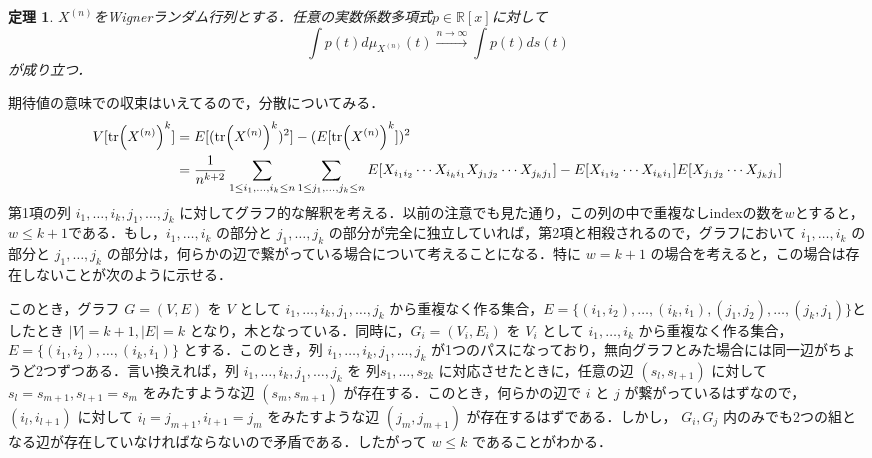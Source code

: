 \documentclass{ltjsarticle}
\makeatletter
\theoremstyle{mystyle1}
\newtheorem{thm}[dfn]{定理}
\theoremstyle{mystyle2}
\theoremstyle{mystyle3}
\renewenvironment{proof}[1][\proofname]{\par
  \pushQED{\qed}%
  \normalfont
  \topsep6\p@\@plus6\p@ \trivlist
  \item[\hskip\labelsep{\bfseries\sffamily #1}]\ignorespaces
}{%
  \popQED\endtrivlist\@endpefalse
}
\renewcommand\proofname{証明}
\makeatother
\begin{document}
\begin{thm}\label{thm:1-26}
    $X^{(n)}$をWignerランダム行列とする．任意の実数係数多項式$p\in\mathbb{R}[x]$に対して
    \begin{equation}
        \int p(t)d\mu_{X^{(n)}}(t)\overset{n\to\infty}{\longrightarrow}\int p(t)ds(t)
    \end{equation}
    が成り立つ．
\end{thm}

\begin{proof}
    期待値の意味での収束はいえてるので，分散についてみる．
    \begin{equation}
        \begin{split}
            V[\tr(X^{(n)})^k]
            & =E[(\tr(X^{(n)})^k)^2]-(E[\tr(X^{(n)})^k])^2                                                                                                                                                               \\
            & =\frac{1}{n^{k+2}}\sum_{1\leq i_1,\ldots,i_k\leq n}\sum_{1\leq j_1,\ldots,j_k\leq n}E[X_{i_1i_2}\cdots X_{i_ki_1}X_{j_1j_2}\cdots X_{j_kj_1}]-E[X_{i_1i_2}\cdots X_{i_ki_1}]E[X_{j_1j_2}\cdots X_{j_kj_1}]
        \end{split}
    \end{equation}
    第1項の列 $i_1,\ldots,i_k,j_1,\ldots,j_k$ に対してグラフ的な解釈を考える．以前の注意でも見た通り，この列の中で重複なしindexの数を$w$とすると，$w\leq k+1$である．もし，$i_1,\ldots,i_k$ の部分と $j_1,\ldots,j_k$ の部分が完全に独立していれば，第2項と相殺されるので，グラフにおいて $i_1,\ldots,i_k$ の部分と $j_1,\ldots,j_k$ の部分は，何らかの辺で繋がっている場合について考えることになる．特に $w=k+1$ の場合を考えると，この場合は存在しないことが次のように示せる．

    このとき，グラフ $G=(V,E)$ を $V$ として $i_1,\ldots,i_k,j_1,\ldots,j_k$ から重複なく作る集合，$E=\{(i_1,i_2),\ldots,(i_k,i_1),(j_1,j_2),\ldots,(j_k,j_1)\}$としたとき $|V|=k+1,|E|=k$ となり，木となっている．同時に，$G_i=(V_i,E_i)$ を $V_i$ として $i_1,\ldots,i_k$ から重複なく作る集合，$E=\{(i_1,i_2),\ldots,(i_k,i_1)\}$ とする．このとき，列 $i_1,\ldots,i_k,j_1,\ldots,j_k$ が1つのパスになっており，無向グラフとみた場合には同一辺がちょうど2つずつある．言い換えれば，列 $i_1,\ldots,i_k,j_1,\ldots,j_k$ を 列$s_1,\ldots,s_{2k}$ に対応させたときに，任意の辺 $(s_l,s_{l+1})$ に対して $s_l=s_{m+1},s_{l+1}=s_m$ をみたすような辺 $(s_m,s_{m+1})$ が存在する．このとき，何らかの辺で $i$ と $j$ が繋がっているはずなので，$(i_l,i_{l+1})$ に対して $i_l=j_{m+1},i_{l+1}=j_m$ をみたすような辺 $(j_m,j_{m+1})$ が存在するはずである．しかし， $G_i,G_j$ 内のみでも2つの組となる辺が存在していなければならないので矛盾である．したがって $w\leq k$ であることがわかる．


\end{proof}
\end{document}
